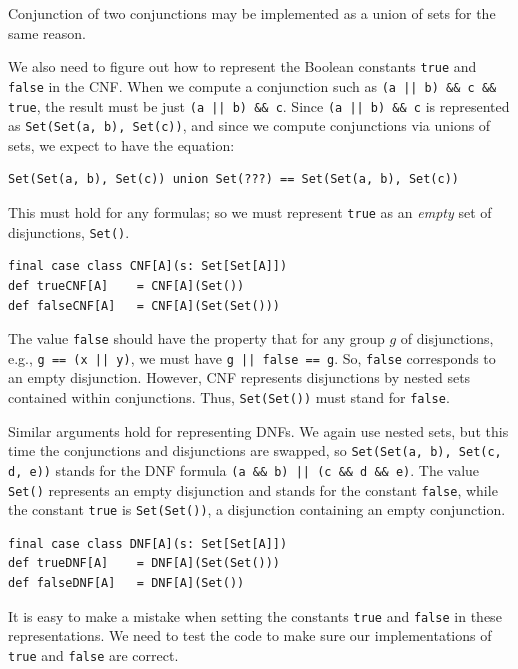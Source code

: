 Conjunction of two conjunctions may be implemented as a union of sets
for the same reason.

We also need to figure out how to represent the Boolean constants
\lstinline!true! and \lstinline!false! in the CNF. When we compute
a conjunction such as \lstinline!(a || b) && c && true!, the result
must be just \lstinline!(a || b) && c!. Since \lstinline!(a || b) && c!
is represented as \lstinline!Set(Set(a, b), Set(c))!, and since we
compute conjunctions via unions of sets, we expect to have the equation:
\begin{lstlisting}
Set(Set(a, b), Set(c)) union Set(???) == Set(Set(a, b), Set(c))
\end{lstlisting}
This must hold for any formulas; so we must represent \lstinline!true!
as an \emph{empty} set of disjunctions, \lstinline!Set()!.
\begin{lstlisting}
final case class CNF[A](s: Set[Set[A]])
def trueCNF[A]    = CNF[A](Set())
def falseCNF[A]   = CNF[A](Set(Set()))
\end{lstlisting}

The value \lstinline!false! should have the property that for any
group $g$ of disjunctions, e.g., \lstinline!g == (x || y)!, we must
have \lstinline!g || false == g!. So, \lstinline!false! corresponds
to an empty disjunction. However, CNF represents disjunctions by nested
sets contained within conjunctions. Thus, \lstinline!Set(Set())!
must stand for \lstinline!false!.

Similar arguments hold for representing DNFs. We again use nested
sets, but this time the conjunctions and disjunctions are swapped,
so \lstinline!Set(Set(a, b), Set(c, d, e))! stands for the  DNF formula
\lstinline!(a && b) || (c && d && e)!. The value \lstinline!Set()!
represents an empty disjunction and stands for the constant \lstinline!false!,
while the constant \lstinline!true! is \lstinline!Set(Set())!, a
disjunction containing an empty conjunction.
\begin{lstlisting}
final case class DNF[A](s: Set[Set[A]])
def trueDNF[A]    = DNF[A](Set(Set()))
def falseDNF[A]   = DNF[A](Set())
\end{lstlisting}
It is easy to make a mistake when setting the constants \lstinline!true!
and \lstinline!false! in these representations. We need to test the
code to make sure our implementations of \lstinline!true! and \lstinline!false!
are correct.

